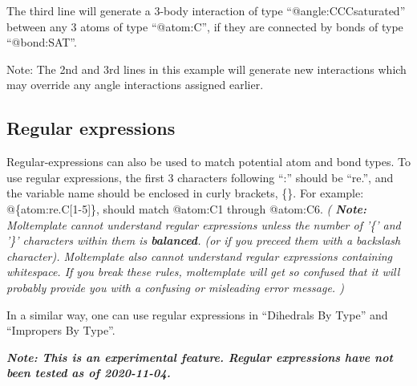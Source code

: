 \documentclass[11pt]{article}
\begin{document}
The third line will generate a 3-body interaction of
type \mbox{``@angle:CCCsaturated''}
between any 3 atoms of type \mbox{``@atom:C''},
if they are connected by bonds of type \mbox{``@bond:SAT''}.

Note: The 2nd and 3rd lines in this example will generate new interactions 
which may override any angle interactions assigned earlier.

\subsection{Regular expressions}
\label{sec:regex}
Regular-expressions can also be used to match potential atom and bond types.
To use regular expressions, the first 3 characters following ``:'' should be
``re.'', and the variable name should be enclosed in curly brackets, \{\}.
For example: \mbox{@\{atom:re.C[1-5]\}}, should match 
\mbox{@atom:C1} through \mbox{@atom:C6}.
\textit{
(
\textbf{Note:}
Moltemplate cannot understand regular expressions unless the
number of '\{' and '\}' characters within them is \textbf{balanced}.
(or if you preceed them with a backslash character).
Moltemplate also cannot understand regular expressions containing whitespace.
If you break these rules, moltemplate will get so confused that it will
probably provide you with a confusing or misleading error message.
)
}

In a similar way, one can use regular expressions in
``Dihedrals By Type'' and ``Impropers By Type''.

\textbf{\textit{Note: This is an experimental feature.  Regular expressions have not been tested as of 2020-11-04.}}
\end{document}
